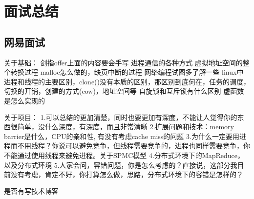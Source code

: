 \section{面试总结}

\subsection{网易面试}
关于基础：
剑指offer上面的内容要会手写
进程通信的各种方式
虚拟地址空间的整个转换过程
malloc怎么做的，缺页中断的过程
网络编程试图多了解一些
linux中进程和线程的主要区别，clone()没有本质的区别，那区别到底何在，任务的调度，切换的开销，创建的方式(cow)，地址空间等
自旋锁和互斥锁有什么区别
虚函数是怎么实现的

关于项目：
1.可以总结的更加清楚，同时也要更加有深度，不能让人觉得你的东西很简单，没什么深度，有深度，而且非常清晰
2.扩展问题和技术：memory barrier是什么，CPU的亲和性, 有没有考虑cache miss的问题
3.为什么一定要用进程而不用线程？你说可以避免竞争，但线程需要竞争的，进程也同样需要竞争，你不能通过使用线程来避免进程。关于SPMC模型
4.分布式环境下的MapReduce，以及分布式环境
5.人家会问，容错问题，你是怎么考虑的？直接说，这部分我目前没有考虑，肯定不好，你打算怎么做，思路，分布式环境下的容错是怎样的？


是否有写技术博客

